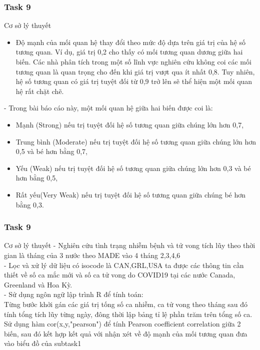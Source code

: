 \documentclass[english,10pt,table]{beamer}
\begin{document}
{
    \frametitle{Task 9}
    \begin{block}{Cơ sở lý thuyết}
	\begin{itemize}
	    \item Độ mạnh của mối quan hệ thay đổi theo mức độ dựa trên giá trị của hệ số tương quan. Ví dụ, giá trị 0,2 cho thấy có mối tương quan dương giữa hai biến. Các nhà phân tích trong một số lĩnh vực nghiên cứu không coi các mối tương quan là quan trọng cho đến khi giá trị vượt qua ít nhất 0,8. Tuy nhiên, hệ số tương quan có giá trị tuyệt đối từ 0,9 trở lên sẽ thể hiện một mối quan hệ rất chặt chẽ.\\
	\end{itemize}
	- Trong bài báo cáo này, một mối quan hệ giữa hai biến được coi là:\\
	\begin{itemize}
	    \item Mạnh (Strong) nếu trị tuyệt đối hệ số tương quan giữa chúng lớn hơn 0,7,\\
		\item Trung bình (Moderate) nếu trị tuyệt đối hệ số tương quan giữa chúng lớn hơn 0,5 và bé hơn bằng 0,7,\\
		\item Yếu (Weak) nếu trị tuyệt đối hệ số tương quan giữa chúng lớn hơn 0,3 và bé hơn bằng 0,5,\\
		\item Rất yếu(Very Weak) nếu trị tuyệt đối hệ số tương quan giữa chúng bé hơn bằng 0,3.\\
	\end{itemize}
    \end{block}
}
\frame
{
    \frametitle{Task 9}
    \begin{block}{Cơ sở lý thuyết}
	- Nghiên cứu tình trạng nhiễm bệnh và tử vong tích lũy theo thời gian là tháng của 3 nước theo MADE vào 4 tháng 2,3,4,6\\
		
	- Lọc và xử lý dữ liệu có isocode là CAN,GRL,USA ta được các thông tin cần thiết về số ca mắc mới và số ca tử vong do COVID19 tại các nước Canada, Greenland và Hoa Kỳ.\\
		
	- Sử dụng ngôn ngữ lập trình R để tính toán:\\
	Từng bước khởi gán các giá trị tống số ca nhiễm, ca tử vong theo tháng sau đó tính tổng  tích lũy từng ngày, đông thời lập bảng tỉ lệ phần trăm trên tổng số ca.\\
	Sử dụng hàm cor(x,y,"pearson") để tính Pearson coefficient correlation giữa 2 biến, sau đó kết hợp kết quả với nhận xét về độ mạnh của mối tương quan đưa vào biểu đồ của subtask1\\
    \end{block}
}
\end{document}
